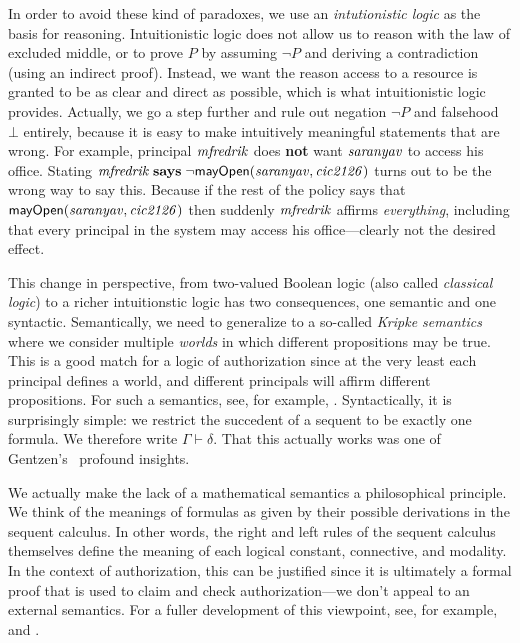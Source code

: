\documentclass[11pt]{article}
\begin{document}
In order to avoid these kind of paradoxes, we use an \emph{intutionistic logic}
as the basis for reasoning.  Intuitionistic logic does not allow us to reason
with the law of excluded middle, or to prove $P$ by assuming $\lnot P$ and
deriving a contradiction (using an indirect proof).  Instead, we want the reason
access to a resource is granted to be as clear and direct as possible, which is
what intuitionistic logic provides.  Actually, we go a step further and
rule out negation $\lnot P$ and falsehood $\bot$ entirely, because it is easy to
make intuitively meaningful statements that are wrong.  For example, principal
$\mathit{mfredrik}$ does \textbf{not} want $\mathit{saranyav}$ to access his office.  Stating
$\mathit{mfredrik} \mathrel{\mathbf{says}} \lnot \mathsf{mayOpen}(\mathit{saranyav}, \mathit{cic2126})$ turns out to be
the wrong way to say this.  Because if the rest of the policy says that
$\mathsf{mayOpen}(\mathit{saranyav}, \mathit{cic2126})$ then suddenly $\mathit{mfredrik}$ affirms
\emph{everything}, including that every principal in the system may access his
office---clearly not the desired effect.

This change in perspective, from two-valued Boolean logic (also called
\emph{classical logic}) to a richer intuitionstic logic has two consequences,
one semantic and one syntactic.  Semantically, we need to generalize to a
so-called \emph{Kripke semantics} where we consider multiple \emph{worlds} in
which different propositions may be true.  This is a good match for a logic of
authorization since at the very least each principal defines a world, and
different principals will affirm different propositions.  For such a semantics,
see, for example, \citet{Garg08imla}.  Syntactically, it is surprisingly simple: we
restrict the succedent of a sequent to be exactly one formula.  We therefore
write $\Gamma \vdash \delta$.  That this actually works was one of
Gentzen's~\citeyearpar{Gentzen35} profound insights.

We actually make the lack of a mathematical semantics a philosophical principle.
We think of the meanings of formulas as given by their possible derivations in
the sequent calculus.  In other words, the right and left rules of the sequent
calculus themselves define the meaning of each logical constant, connective, and
modality.  In the context of authorization, this can be justified since it is
ultimately a formal proof that is used to claim and check authorization---we
don't appeal to an external semantics.  For a fuller development of this
viewpoint, see, for example, \citet{Dummett91} and \citet{MartinLof83}.
\end{document}
